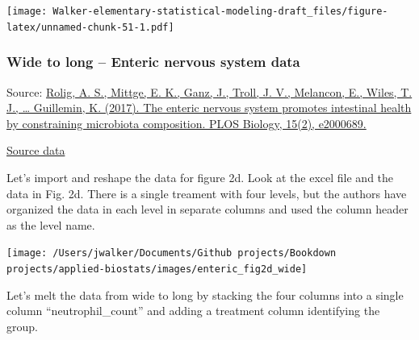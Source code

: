 \documentclass[]{book}
\begin{document}
\texttt{[image: Walker-elementary-statistical-modeling-draft\_files/figure-latex/unnamed-chunk-51-1.pdf]}

\hypertarget{wide-to-long-enteric-nervous-system-data}{%
\subsubsection{Wide to long -- Enteric nervous system data}\label{wide-to-long-enteric-nervous-system-data}}

Source: \href{https://doi.org/10.1371/journal.pbio.2000689}{Rolig, A. S., Mittge, E. K., Ganz, J., Troll, J. V., Melancon, E., Wiles, T. J., \ldots{} Guillemin, K. (2017). The enteric nervous system promotes intestinal health by constraining microbiota composition. PLOS Biology, 15(2), e2000689.}

\href{https://doi.org/10.1371/journal.pbio.2000689.s008}{Source data}

Let's import and reshape the data for figure 2d. Look at the excel file and the data in Fig. 2d. There is a single treament with four levels, but the authors have organized the data in each level in separate columns and used the column header as the level name.

\texttt{[image: /Users/jwalker/Documents/Github projects/Bookdown projects/applied-biostats/images/enteric\_fig2d\_wide]}

Let's melt the data from wide to long by stacking the four columns into a single column ``neutrophil\_count'' and adding a treatment column identifying the group.
\end{document}
